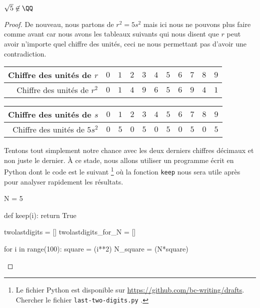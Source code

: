 \begin{fact} \label{sqrt-5-not-in-Q}
	$\sqrt5 \not\in \QQ$
\end{fact}

\begin{proof}
	De nouveau, nous partons de $r^2 = 5s^2$ mais ici nous ne pouvons plus faire comme avant car nous avons les tableaux suivants qui nous disent que $r$ peut avoir n'importe quel chiffre des unités, ceci ne nous permettant pas d'avoir une contradiction.

	\begin{center}
		\begin{tabular}{|r|c|c|c|c|c|c|c|c|c|c|}
			\hline
			Chiffre des unités de $r$
			  & $0$  &  $1$  &  $2$  &  $3$  &  $4$  &  $5$  &  $6$  &  $7$  &  $8$  &  $9$
			\\ \hline
			\phantom{$5$}Chiffre des unités de $r^2$
			  & $0$  &  $1$  &  $4$  &  $9$  &  $6$  &  $5$  &  $6$  &  $9$  &  $4$  &  $1$
			\\ \hline
		\end{tabular}

		\medskip

		\begin{tabular}{|r|c|c|c|c|c|c|c|c|c|c|}
			\hline
			Chiffre des unités de $s$
			  & $0$  &  $1$  &  $2$  &  $3$  &  $4$  &  $5$  &  $6$  &  $7$  &  $8$  &  $9$
			\\ \hline
			Chiffre des unités de $5s^2$
			  & $0$  &  $5$  &  $0$  &  $5$  &  $0$  &  $5$  &  $0$  &  $5$  &  $0$  &  $5$
			\\ \hline
		\end{tabular}
	\end{center}

    \medskip

    Tentons tout simplement notre chance avec les deux derniers chiffres décimaux et non juste le dernier.
    À ce stade, nous allons utiliser un programme écrit en Python dont le code est le suivant
    \footnote{
    	Le fichier Python est disponible sur \url{https://github.com/bc-writing/drafts}.
		Chercher le fichier \texttt{last-two-digits.py} .
	}
	où la fonction \verb+keep+ nous sera utile après pour analyser rapidement les résultats.

	\begin{rawcode}
N = 5

def keep(i):
    return True

twolastdigits       = []
twolastdigits_for_N = []

for i in range(100):
    square   = (i**2)%
    N_square = (N*square)%


\end{rawcode}
\end{proof}
